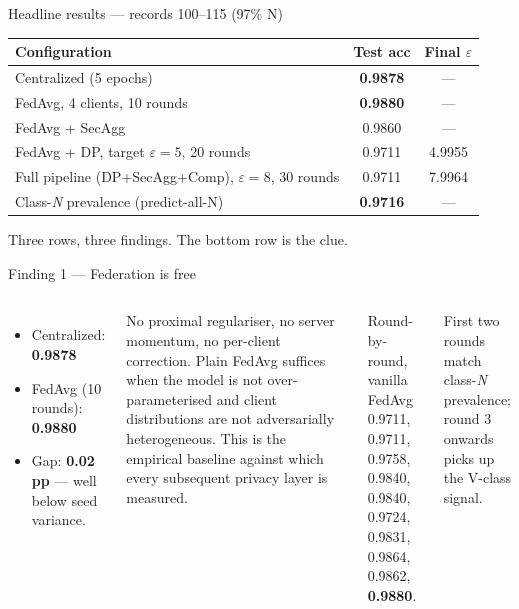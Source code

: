 \documentclass[10pt,aspectratio=169]{beamer}
\begin{document}
\begin{frame}{Headline results --- records 100--115 (97\% N)}
  \begin{table}
    \centering
    \begin{tabular}{lcc}
      \toprule
      Configuration & Test acc & Final $\varepsilon$ \\
      \midrule
      Centralized (5 epochs)                                & \textbf{0.9878} & --- \\
      FedAvg, 4 clients, 10 rounds                          & \textbf{0.9880} & --- \\
      FedAvg + SecAgg                                       & 0.9860          & --- \\
      FedAvg + DP, target $\varepsilon = 5$, 20 rounds      & 0.9711          & 4.9955 \\
      Full pipeline (DP+SecAgg+Comp), $\varepsilon=8$, 30 rounds & 0.9711      & 7.9964 \\
      \midrule
      Class-\emph{N} prevalence (predict-all-N)             & \textcolor{red!70!black}{\textbf{0.9716}} & --- \\
      \bottomrule
    \end{tabular}
  \end{table}
  \vspace{0.5em}
  Three rows, three findings. The bottom row is the clue.
\end{frame}

\begin{frame}{Finding 1 --- Federation is free}
  \begin{columns}[T]
    \begin{itemize}
      \item Centralized: \textbf{0.9878}
      \item FedAvg (10 rounds): \textbf{0.9880}
      \item Gap: \textbf{0.02 pp} --- well below seed variance.
    \end{itemize}
    \vspace{0.5em}
    No proximal regulariser, no server momentum, no per-client correction. Plain FedAvg suffices when the model is not over-parameterised and client distributions are not adversarially heterogeneous.
    \vspace{0.5em}
    This is the empirical baseline against which every subsequent privacy layer is measured.
    \begin{block}{Round-by-round, vanilla FedAvg}
      \footnotesize
      0.9711, 0.9711, 0.9758, 0.9840, 0.9840,\\
      0.9724, 0.9831, 0.9864, 0.9862, \textbf{0.9880}.
    \end{block}
    \vspace{0.5em}
    First two rounds match class-\emph{N} prevalence; round 3 onwards picks up the V-class signal.
  \end{columns}
\end{frame}
\end{document}
